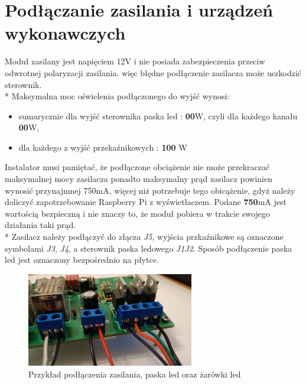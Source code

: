\documentclass[12pt, eng, twoside, openany, final]{mgr}
\begin{document}
    \section{Podłączanie zasilania i urządzeń wykonawczych}
    Moduł zasilany jest napięciem 12V i nie posiada zabezpieczenia przeciw odwrotnej polaryzacji zasilania. więc błędne podłączenie zasilacza może uszkodzić sterownik. \\*
    Maksymalna moc oświelenia podłączonego do wyjść wynosi:
    \begin{itemize}
        \item sumarycznie dla wyjść sterownika paska led : \textbf{00}W, czyli dla każdego kanału \textbf{00}W,
        \item dla każdego z wyjść przekaźnikowych : \textbf{100} W
    \end{itemize}
    Instalator musi pamiętać, że podłączone obciążenie nie może przekraczać maksymalnej mocy zasilacza ponadto maksymalny prąd zasilacz powinien wynosić przynajmnej 750mA, więcej niż potrzebuje tego obicążenie, gdyż należy doliczyć zapotrzebowanie Raspberry Pi z wyświetlaczem. Podane \textbf{750}mA jest wartością bezpieczną i nie znaczy to, że moduł pobiera w trakcie swojego działania taki prąd. \\*
    Zasilacz należy podłączyć do złącza \emph{J5}, wyjścia przkaźnikowe są oznaczone symbolami \emph{J3}, \emph{J4}, a sterownik paska ledowego \emph{J1J2}. Sposób podłączenie paska led jest oznaczony bezpośrednio na płytce. 
        \begin{figure}[H]
        \begin{center}
            \includegraphics[width=0.65\textwidth]{podlaczone.jpg}
            \caption{Przykład podłączenia zasilania, paska led oraz żarówki led}
        \end{center}
        \end{figure}
    \newpage
    
\end{document}
